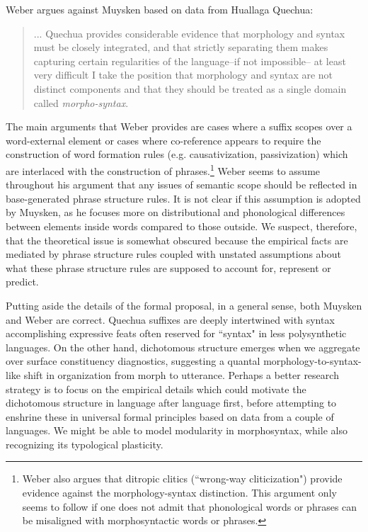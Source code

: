 \documentclass[output=paper]{langscibook}
\begin{document}
Weber argues against Muysken based on data from Huallaga Quechua:

\begin{quote}
    ... Quechua provides considerable evidence that morphology and syntax must be closely integrated, and that strictly separating them makes capturing certain regularities of the language--if not impossible-- at least very difficult I take the position that morphology and syntax are not distinct components and that they should be treated as a single domain called \textit{morpho-syntax}. \citep[162]{weber1983relationship}

\end{quote}
The main arguments that Weber provides are cases where a suffix scopes over a word-external element or cases where co-reference appears to require the construction of word formation rules (e.g. causativization, passivization) which are interlaced with the construction of phrases.\footnote{Weber \citeyear[176]{weber1993binding} also argues that ditropic clitics (``wrong-way cliticization") provide evidence against the morphology-syntax distinction. This argument only seems to follow if one does not admit that phonological words or phrases can be misaligned with morphosyntactic words or phrases.} Weber seems to assume throughout his argument that any issues of semantic scope should be reflected in base-generated phrase structure rules. It is not clear if this assumption is adopted by Muysken, as he focuses more on distributional and phonological differences between elements inside words compared to those outside. We suspect, therefore, that the theoretical issue is somewhat obscured because the empirical facts are mediated by phrase structure rules coupled with unstated assumptions about what these phrase structure rules are supposed to account for, represent or predict.

Putting aside the details of the formal proposal, in a general sense, both Muysken and Weber are correct. Quechua suffixes are deeply intertwined with syntax accomplishing expressive feats often reserved for ``syntax" in less polysynthetic languages. On the other hand, dichotomous structure emerges when we aggregate over surface constituency diagnostics, suggesting a quantal morphology-to-syntax-like shift in organization from morph to utterance. Perhaps a better research strategy is to focus on the empirical details which could motivate the dichotomous structure in language after language first, before attempting to enshrine these in universal formal principles based on data from a couple of languages. We might be able to model modularity in morphosyntax,  while also recognizing its typological plasticity. 
\end{document}
